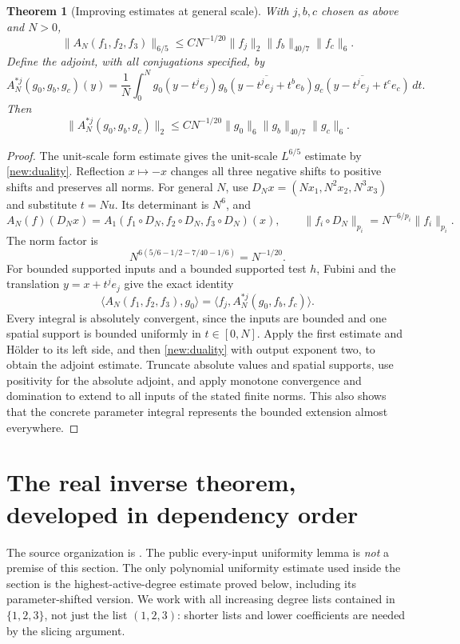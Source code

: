 \documentclass[11pt]{article}
\newtheorem{theorem}{Theorem}[section]
\theoremstyle{definition}
\begin{document}
\begin{theorem}[Improving estimates at general scale]\label{new:improving}
With $j,b,c$ chosen as above and $N>0$,
\[
 \|A_N(f_1,f_2,f_3)\|_{6/5}
 \leq C N^{-1/20}\|f_j\|_2\|f_b\|_{40/7}\|f_c\|_6.
\]
Define the adjoint, with all conjugations specified, by
\[
 A_N^{*j}(g_0,g_b,g_c)(y)
 =\frac1N\int_0^N g_0(y-t^je_j)
        \overline{g_b(y-t^je_j+t^be_b)}
        \overline{g_c(y-t^je_j+t^ce_c)}\,dt.
\]
Then
\[
 \|A_N^{*j}(g_0,g_b,g_c)\|_2
 \leq C N^{-1/20}\|g_0\|_6\|g_b\|_{40/7}\|g_c\|_6.
\]
\end{theorem}
\begin{proof}
The unit-scale form estimate gives the unit-scale $L^{6/5}$ estimate by
\cref{new:duality}. Reflection $x\mapsto-x$ changes all three negative shifts to positive
shifts and preserves all norms. For general $N$, use
$D_Nx=(Nx_1,N^2x_2,N^3x_3)$ and substitute $t=Nu$. Its determinant is $N^6$, and
\[
 A_N(f)(D_Nx)=A_1(f_1\circ D_N,f_2\circ D_N,f_3\circ D_N)(x),
 \qquad \|f_i\circ D_N\|_{p_i}=N^{-6/p_i}\|f_i\|_{p_i}.
\]
The norm factor is
\[
 N^{6(5/6-1/2-7/40-1/6)}=N^{-1/20}.
\]
For bounded supported inputs and a bounded supported test $h$, Fubini and the translation
$y=x+t^je_j$ give the exact identity
\[
 \langle A_N(f_1,f_2,f_3),g_0\rangle
 =\langle f_j,A_N^{*j}(g_0,f_b,f_c)\rangle.
\]
Every integral is absolutely convergent, since the inputs are bounded and one spatial
support is bounded uniformly in $t\in[0,N]$. Apply the first estimate and H\"older to its
left side, and then \cref{new:duality} with output exponent two, to obtain the adjoint
estimate. Truncate absolute values and spatial supports, use positivity for the absolute
adjoint, and apply monotone convergence and domination to extend to all inputs of the
stated finite norms. This also shows that the concrete parameter integral represents the
bounded extension almost everywhere.
\end{proof}


\section{The real inverse theorem, developed in dependency order}\label{sec:internal-kosz-adjoint}
The source organization is \cite[\S\S4.2--4.5]{KoszEtAl}.  The public every-input uniformity
lemma is \emph{not} a premise of this section.  The only polynomial uniformity estimate used
inside the section is the highest-active-degree estimate proved below, including its
parameter-shifted version.  We work with all increasing degree lists contained in $\{1,2,3\}$,
not just the list $(1,2,3)$: shorter lists and lower coefficients are needed by the slicing argument.
\end{document}
